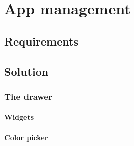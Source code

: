 \section{App management}
\subsection{Requirements}
\subsection{Solution}
\subsubsection{The drawer}
\paragraph{Widgets}
\paragraph{Color picker}
